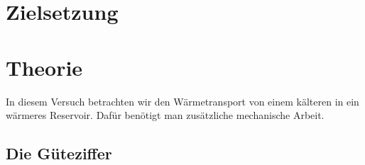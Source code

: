 \section{Zielsetzung}
\label{sec:Zielsetzung}
\section{Theorie}
\label{sec:Theorie}
In diesem Versuch betrachten wir den Wärmetransport von einem kälteren in ein wärmeres Reservoir. 
Dafür benötigt man zusätzliche mechanische Arbeit.
\subsection{Die Güteziffer}

\cite{sample}
